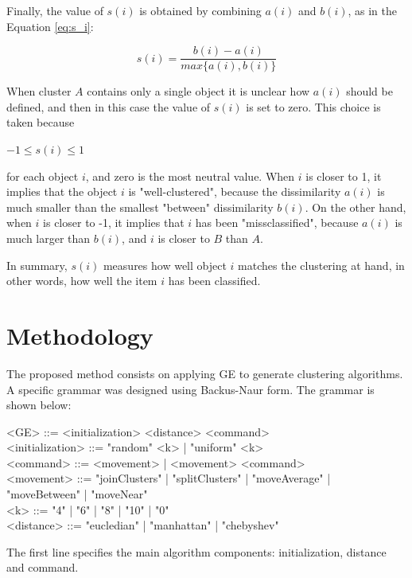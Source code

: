 \documentclass[journal]{IEEEtran}
\begin{document}
	Finally, the value of $s(i)$ is obtained by combining $a(i)$ and $b(i)$, as in the Equation \ref{eq:s_i}:
	
	\begin{equation} \label{eq:s_i}
	s(i) = \frac{b(i) - a(i)}{max\{a(i), b(i)\}}
	\end{equation}
	
	When cluster $A$ contains only a single object it is unclear how $a(i)$ should be defined, and then in this case the value of $s(i)$ is set to zero. This choice is taken because
	\begin{center}
		$-1 \le s(i) \le 1$
	\end{center}
	
	for each object $i$, and zero is the most neutral value. When $i$ is closer to 1, it implies that the object $i$ is "well-clustered", because the dissimilarity $a(i)$ is much smaller than the smallest "between" dissimilarity $b(i)$. On the other hand, when $i$ is closer to -1, it implies that $i$ has been "missclassified", because $a(i)$ is much larger than $b(i)$, and $i$ is closer to $B$ than $A$.
	
	In summary, $s(i)$ measures how well object $i$ matches the clustering at hand, in other words, how well the item $i$ has been classified.
	
	
	\section{Methodology} \label{sec:methodology}
	
	The proposed method consists on applying GE to generate clustering algorithms. A specific grammar was designed  using  Backus-Naur form. The grammar is shown below:
	
	\begin{grammar}
		<GE> ::= <initialization> <distance> <command> 
		\\ <initialization> ::= "random" <k> | "uniform" <k>
		\\ <command> ::= <movement> | <movement> <command>
		\\ <movement> ::= "joinClusters" | "splitClusters" | "moveAverage" | "moveBetween" | "moveNear" 
		\\ <k> ::= "4" | "6" | "8" | "10" | "0"
		\\ <distance> ::= "eucledian" | "manhattan" | "chebyshev"
		\label{ge-clustering-grammar}
	\end{grammar}
	
	The first line specifies the main algorithm components: initialization, distance and command. 
	
\end{document}
